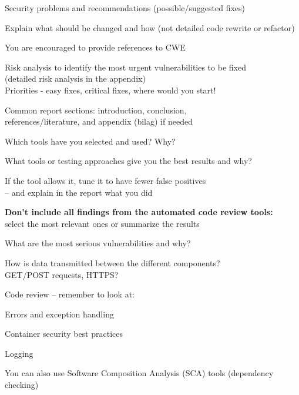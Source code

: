 \documentclass[Screen16to9,17pt]{foils}
\begin{document}

\begin{list1}
\item Security problems and recommendations (possible/suggested fixes)
  \begin{list2}
  \item Explain what should be changed and how (not detailed code rewrite or refactor)
  \item You are encouraged to provide references to CWE
  \end{list2}
\item Risk analysis to identify the most urgent vulnerabilities to be fixed\\
  (detailed risk analysis in the appendix)\\
  Priorities - easy fixes, critical fixes, where would you start!
\item Common report sections: introduction, conclusion,\\
  references/literature, and appendix (bilag) if needed
\end{list1}


\begin{list2}
\item Which tools have you selected and used? Why?
\item What tools or testing approaches give you the best results and why?
\item If the tool allows it, tune it to have fewer false positives\\
  -- and explain in the report what you did
\item \textbf{Don't include all findings from the automated code review tools:}\\
  select the most relevant ones or summarize the results
\end{list2}


\begin{list1}
\item What are the most serious vulnerabilities and why?
\item How is data transmitted between the different components?\\
  GET/POST requests, HTTPS?
\item Code review -- remember to look at:
  \begin{list2}
  \item Errors and exception handling
  \item Container security best practices
  \item Logging
\item You can also use Software Composition Analysis (SCA) tools (dependency checking)
\end{list2}
\end{list1}
\end{document}
